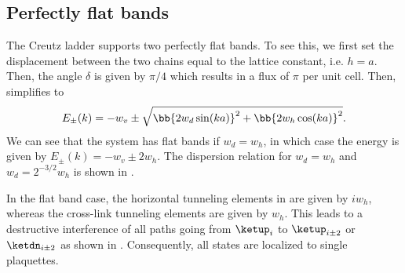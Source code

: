 \subsection{Perfectly flat bands}
The Creutz ladder supports two perfectly flat bands. To see this, we first set the displacement between the two chains equal to the lattice constant, i.e. $h=a$.
Then, the angle $\delta$ is given by $\pi/4$ which results in a flux of $\pi$ per unit cell.
Then,  simplifies to
\begin{align}
    E_\pm(k) = -w_v \pm \sqrt{ \bb{ 2w_d\sin(ka) }^2 + \bb{ 2w_h\cos(ka) }^2 }.
\end{align}
We can see that the system has flat bands if $w_d = w_h$, in which case the energy is given by $E_\pm(k) = -w_v \pm 2 w_h$.
The dispersion relation for $w_d=w_h$ and $w_d = 2^{-3/2} w_h$ is shown in .

In the flat band case, the horizontal tunneling elements in  are given by $i w_h$, whereas the cross-link tunneling elements are given by $w_h$.
This leads to a destructive interference of all paths going from $\ketup_i$ to $\ketup_{i \pm 2}$ or $\ketdn_{i\pm 2}$ as shown in .
Consequently, all states are localized to single plaquettes.



